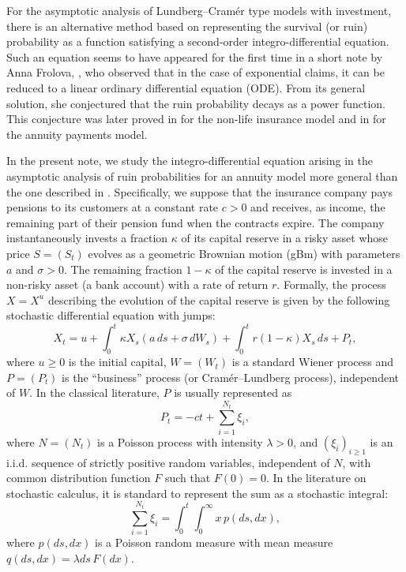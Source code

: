 For the asymptotic analysis of Lundberg--Cram\'er type models with investment, there is an alternative method based on representing the survival (or ruin) probability as a function satisfying a second-order integro-differential equation. Such an equation seems to have appeared for the first time in a short note by Anna Frolova, \cite{Fr}, who observed that in the case of exponential claims, it can be reduced to a linear ordinary differential equation (ODE). From its general solution, she conjectured that the ruin probability decays as a power function. This conjecture was later proved in \cite{FrKP} for the non-life insurance model and in \cite{KP2016} for the annuity payments model.

In the present note, we study the integro-differential equation arising in the asymptotic analysis of ruin probabilities for an annuity model more general than the one described in \cite{KP2016}. Specifically, we suppose that the insurance company pays pensions to its customers at a constant rate $c>0$ and receives, as income, the remaining part of their pension fund when the contracts expire. The company instantaneously invests a fraction $\kappa$ of its capital reserve in a risky asset whose price $S=(S_t)$ evolves as a geometric Brownian motion (gBm) with parameters $a$ and $\sigma>0$. The remaining fraction $1-\kappa$ of the capital reserve is invested in a non-risky asset (a bank account) with a rate of return $r$. Formally, the process $X=X^u$ describing the evolution of the capital reserve is given by the following stochastic differential equation with jumps:
\begin{equation}\label{one}
X_t = u + \int_0^t \kappa X_s (a\,ds +\sigma\,dW_s) + \int_0^t r(1-\kappa)X_s\,ds + P_t,
\end{equation}
where $u \ge 0$ is the initial capital, $W=(W_t)$ is a standard Wiener process and $P=(P_t)$ is the ``business'' process (or Cram\'er--Lundberg process), independent of $W$. In the classical literature, $P$ is usually represented as
\[
P_t = -ct + \sum_{i=1}^{N_t} \xi_i,
\]
where $N=(N_t)$ is a Poisson process with intensity $\lambda > 0$, and $(\xi_i)_{i\ge 1}$ is an i.i.d. sequence of strictly positive random variables, independent of $N$, with common distribution function $F$ such that $F(0)=0$. 
In the literature on stochastic calculus, it is standard to represent the sum as a stochastic integral:
\[
\sum_{i=1}^{N_t} \xi_i = \int_0^t \int_0^\infty x\,p(ds,dx) ,
\]
where $p(ds,dx)$ is a Poisson random measure with mean measure $q(ds,dx) = \lambda ds\,F(dx)$.

